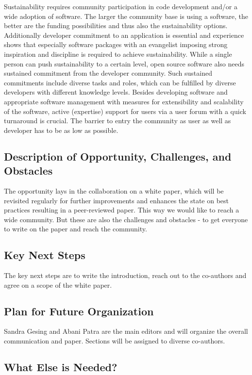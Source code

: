 Sustainability requires community participation in code development and/or a wide adoption of software. The larger the community base is using a software, the better are the funding possibilities and thus also the sustainability options. Additionally developer commitment to an application is essential and experience shows that especially software packages with an evangelist imposing strong inspiration and discipline is required to achieve sustainability.
While a single person can push sustainability to a certain level, open source software also needs sustained commitment from the developer community. Such sustained commitments include diverse tasks and roles, which can be fulfilled by diverse developers with different knowledge levels. Besides developing software and appropriate software management with measures for extensibility and scalability of the software, active (expertise) support for users via a user forum with a quick turnaround is crucial. The barrier to entry the community as user as well as developer has to be as low as possible.

\subsection{Description of Opportunity, Challenges, and Obstacles}

The opportunity lays in the collaboration on a white paper, which will be revisited regularly for further improvements and enhances the state on best practices resulting in a peer-reviewed paper. This way we would like to reach a wide community. But these are also the challenges and obstacles - to get everyone to write on the paper and reach the community.

\subsection{Key Next Steps}

The key next steps are to write the introduction, reach out to the co-authors and agree on a scope of the white paper.

\subsection{Plan for Future Organization}

Sandra Gesing and Abani Patra are the main editors and will organize the overall communication and paper. Sections will be assigned to diverse co-authors.

\subsection{What Else is Needed?}

